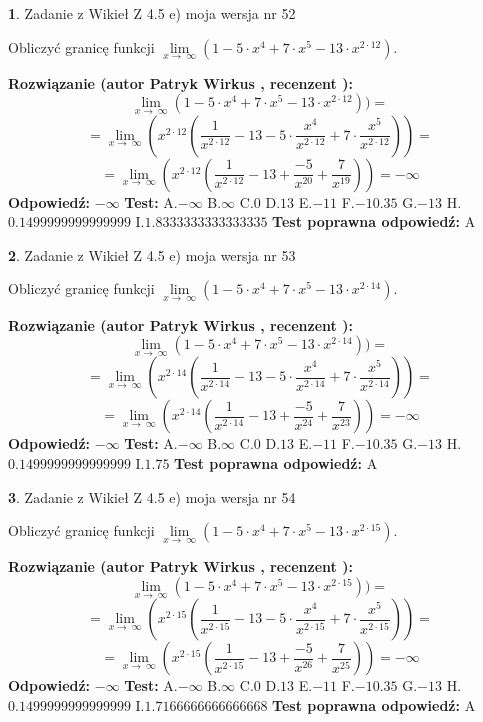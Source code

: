\documentclass[12pt, a4paper]{article}
\theoremstyle{definition} %
\newtheorem{zad}{}
\newcommand{\zadStart}[1]{\begin{zad}#1\newline}
\newcommand{\zadStop}{\end{zad}}
\newcommand{\rozwStart}[2]{\noindent \textbf{Rozwiązanie (autor #1 , recenzent #2): }\newline}
\newcommand{\rozwStop}{\newline}
\newcommand{\odpStart}{\noindent \textbf{Odpowiedź:}\newline}
\newcommand{\odpStop}{\newline}
\newcommand{\testStart}{\noindent \textbf{Test:}\newline}
\newcommand{\testStop}{\newline}
\newcommand{\kluczStart}{\noindent \textbf{Test poprawna odpowiedź:}\newline}
\newcommand{\kluczStop}{\newline}
\begin{document}
\zadStart{Zadanie z Wikieł Z 4.5 e) moja wersja nr 52}


Obliczyć granicę funkcji  $\lim\limits_{x\to\ \infty}(1 - 5 \cdot x^{4}+7 \cdot x^{5}- 13 \cdot x^{2\cdot12})$.
\zadStop
\rozwStart{Patryk Wirkus}{}
$$\lim\limits_{x\to\ \infty}(1 - 5 \cdot x^{4}+7 \cdot x^{5}- 13 \cdot x^{2\cdot12}))=$$
$$=\lim\limits_{x\to\ \infty}(x^{2\cdot12}(\frac{1}{x^{2\cdot12}}-13 -5 \cdot \frac{x^{4}}{x^{2\cdot12}}+7 \cdot \frac{x^{5}}{x^{2\cdot12}}))=$$
$$=\lim\limits_{x\to\ \infty}(x^{2\cdot12}(\frac{1}{x^{2\cdot12}}-13 + \frac{-5}{x^{20}}+ \frac{7}{x^{19}}))=-\infty$$
\rozwStop
\odpStart
$-\infty$
\odpStop
\testStart
A.$-\infty$ B.$\infty$ C.$0$ D.$13$ E.$-11$
F.$-10.35$ G.$-13$
H.$0.1499999999999999$
I.$1.8333333333333335$
\testStop
\kluczStart
A
\kluczStop



\zadStart{Zadanie z Wikieł Z 4.5 e) moja wersja nr 53}


Obliczyć granicę funkcji  $\lim\limits_{x\to\ \infty}(1 - 5 \cdot x^{4}+7 \cdot x^{5}- 13 \cdot x^{2\cdot14})$.
\zadStop
\rozwStart{Patryk Wirkus}{}
$$\lim\limits_{x\to\ \infty}(1 - 5 \cdot x^{4}+7 \cdot x^{5}- 13 \cdot x^{2\cdot14}))=$$
$$=\lim\limits_{x\to\ \infty}(x^{2\cdot14}(\frac{1}{x^{2\cdot14}}-13 -5 \cdot \frac{x^{4}}{x^{2\cdot14}}+7 \cdot \frac{x^{5}}{x^{2\cdot14}}))=$$
$$=\lim\limits_{x\to\ \infty}(x^{2\cdot14}(\frac{1}{x^{2\cdot14}}-13 + \frac{-5}{x^{24}}+ \frac{7}{x^{23}}))=-\infty$$
\rozwStop
\odpStart
$-\infty$
\odpStop
\testStart
A.$-\infty$ B.$\infty$ C.$0$ D.$13$ E.$-11$
F.$-10.35$ G.$-13$
H.$0.1499999999999999$
I.$1.75$
\testStop
\kluczStart
A
\kluczStop



\zadStart{Zadanie z Wikieł Z 4.5 e) moja wersja nr 54}


Obliczyć granicę funkcji  $\lim\limits_{x\to\ \infty}(1 - 5 \cdot x^{4}+7 \cdot x^{5}- 13 \cdot x^{2\cdot15})$.
\zadStop
\rozwStart{Patryk Wirkus}{}
$$\lim\limits_{x\to\ \infty}(1 - 5 \cdot x^{4}+7 \cdot x^{5}- 13 \cdot x^{2\cdot15}))=$$
$$=\lim\limits_{x\to\ \infty}(x^{2\cdot15}(\frac{1}{x^{2\cdot15}}-13 -5 \cdot \frac{x^{4}}{x^{2\cdot15}}+7 \cdot \frac{x^{5}}{x^{2\cdot15}}))=$$
$$=\lim\limits_{x\to\ \infty}(x^{2\cdot15}(\frac{1}{x^{2\cdot15}}-13 + \frac{-5}{x^{26}}+ \frac{7}{x^{25}}))=-\infty$$
\rozwStop
\odpStart
$-\infty$
\odpStop
\testStart
A.$-\infty$ B.$\infty$ C.$0$ D.$13$ E.$-11$
F.$-10.35$ G.$-13$
H.$0.1499999999999999$
I.$1.7166666666666668$
\testStop
\kluczStart
A
\kluczStop
\end{document}
